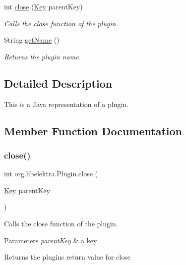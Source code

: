 \begin{DoxyCompactItemize}
int \hyperlink{interfaceorg_1_1libelektra_1_1Plugin_aa5d4abf6ffd0d477d6972b13bed05d41}{close} (\hyperlink{classorg_1_1libelektra_1_1Key}{Key} parent\+Key)
\begin{DoxyCompactList}\small\item\em Calls the close function of the plugin. \end{DoxyCompactList}\item 
String \hyperlink{interfaceorg_1_1libelektra_1_1Plugin_a51be1d6efdd3542c2ae503031bd16e04}{get\+Name} ()
\begin{DoxyCompactList}\small\item\em Returns the plugin name. \end{DoxyCompactList}\end{DoxyCompactItemize}


\subsection{Detailed Description}
This is a Java representation of a plugin. 

\subsection{Member Function Documentation}
\mbox{\label{interfaceorg_1_1libelektra_1_1Plugin_aa5d4abf6ffd0d477d6972b13bed05d41}} 
\subsubsection{\texorpdfstring{close()}{close()}}
{\footnotesize\ttfamily int org.\+libelektra.\+Plugin.\+close (\begin{DoxyParamCaption}\item[{\hyperlink{classorg_1_1libelektra_1_1Key}{Key}}]{parent\+Key }\end{DoxyParamCaption})}



Calls the close function of the plugin. 


\begin{DoxyParams}{Parameters}
{\em parent\+Key} & a key \\
\hline
\end{DoxyParams}
\begin{DoxyReturn}{Returns}
the plugin\textquotesingle{}s return value for close 
\end{DoxyReturn}


